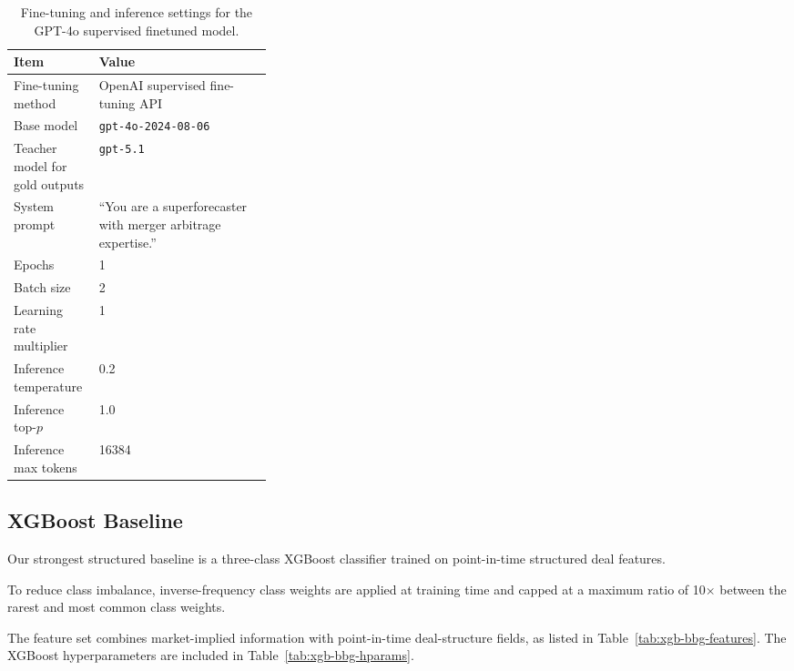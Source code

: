 \documentclass{article}
\theoremstyle{plain}
\theoremstyle{definition}
\theoremstyle{remark}
\begin{document}
\begin{table}[h]
\centering
\small
\begin{tabularx}{\linewidth}{@{} >{\raggedright\arraybackslash}p{0.33\linewidth} X @{}}
\toprule
\textbf{Item} & \textbf{Value} \\
\midrule
Fine-tuning method & OpenAI supervised fine-tuning API \\
Base model & \texttt{gpt-4o-2024-08-06} \\
Teacher model for gold outputs & \texttt{gpt-5.1} \\
System prompt & ``You are a superforecaster with merger arbitrage expertise.'' \\
Epochs & 1 \\
Batch size & 2 \\
Learning rate multiplier & 1 \\
Inference temperature & 0.2 \\
Inference top-$p$ & 1.0 \\
Inference max tokens & 16384 \\
\bottomrule
\end{tabularx}
\caption{Fine-tuning and inference settings for the GPT-4o supervised finetuned model.}
\label{tab:ft-details}
\end{table}

\subsection{XGBoost Baseline}
\label{app:xgboost-details}

Our strongest structured baseline is a three-class XGBoost classifier trained on point-in-time structured deal features. 

To reduce class imbalance, inverse-frequency class weights are applied at training time and capped at a maximum ratio of 10$\times$ between the rarest and most common class weights.

The feature set combines market-implied information with point-in-time deal-structure fields, as listed in Table~\ref{tab:xgb-bbg-features}. The XGBoost hyperparameters are included in Table~\ref{tab:xgb-bbg-hparams}.
\end{document}
